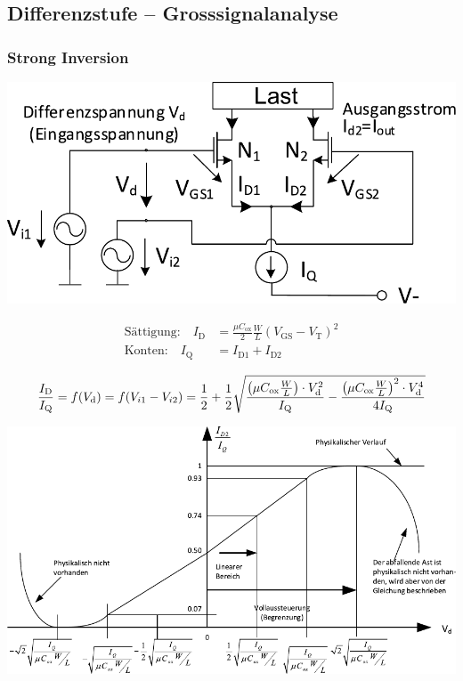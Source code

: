\subsection{Differenzstufe -- Grosssignalanalyse\label{opamp:diff.stufe:grossignal}}

\subsubsection{Strong Inversion}

\begin{minipage}[t]{0.48\columnwidth}
    \includegraphics[width=\columnwidth, align=t]{images/09_differenzstufe_grosssignalanalyse.pdf}
\end{minipage}
\hfill
\begin{minipage}[t]{0.48\columnwidth}
    \begin{align*}
        \text{Sättigung:} \quad     I_\text{D}  &= \frac{\mu C_\text{ox}}{2} \frac{W}{L} (V_\text{GS} - V_\text{T})^2    \\
        \text{Konten:} \quad        I_\text{Q}  &= I_\text{D1} + I_\text{D2} 
    \end{align*}
\end{minipage}

\[
    \frac{I_\text{D}}{I_\text{Q}} = f(V_{\rm d}) = f(V_{i1} - V_{i2}) = \frac{1}{2} + \frac{1}{2} \sqrt{\frac{\left(\mu C_\text{ox} \frac{W}{L}\right) \cdot V_\text{d}^2}{I_\text{Q}} - \frac{\left(\mu C_\text{ox} \frac{W}{L}\right)^2 \cdot V_\text{d}^4}{4 I_\text{Q}}}
\]


\includegraphics[width=\columnwidth, align=t]{images/09_differenzstufe_grosssignalanalyse_strong_inv.pdf}



